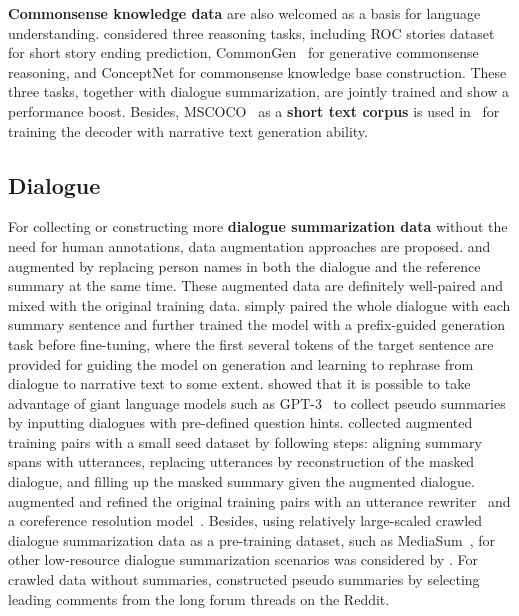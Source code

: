 \textbf{Commonsense knowledge data} are also welcomed as a
basis for language understanding.
\citet{khalifa2021bag} considered three reasoning tasks, including ROC stories 
dataset~\cite{mostafazadeh2016corpus} for short story ending prediction, 
CommonGen~\cite{lin2020commongen} for generative commonsense reasoning, 
and ConceptNet for commonsense knowledge base construction. 
These three tasks, together with dialogue summarization, are jointly trained and show a performance boost.
Besides, MSCOCO~\cite{lin2014microsoft} as a \textbf{short text corpus} is used in~\citet{zou2021low} for training the decoder with narrative text generation ability.


\subsection{Dialogue}

For collecting or constructing more \textbf{dialogue summarization data} 
without the need for human annotations, data augmentation approaches are 
proposed. \citet{liu2021controllable} and \citet{khalifa2021bag} augmented 
by replacing person names in both the dialogue and the reference summary 
at the same time. These augmented data are definitely well-paired and 
mixed with the original training data. 
\citet{jia-etal-2022-post} simply paired the whole dialogue with each summary sentence and further trained the model with a prefix-guided generation task before fine-tuning, where the first several tokens of the target sentence are provided for guiding the model on generation and learning to rephrase from dialogue to narrative text to some extent.
\citet{asi2022end} showed that it is possible to take advantage of giant language models such as GPT-3~\cite{brown2020language} to collect pseudo summaries by inputting dialogues with pre-defined question hints.
\citet{liu2022data} collected augmented training pairs with a small seed dataset by following steps: aligning summary spans with utterances, replacing utterances by reconstruction of the masked dialogue,
and filling up the masked summary given the augmented dialogue. 
\citet{fang2022spoken} augmented and refined the original training pairs with an utterance rewriter~\cite{liu2020incomplete} and a coreference resolution model~\cite{joshi2020spanbert}.
Besides, using relatively large-scaled crawled dialogue summarization data as 
a pre-training dataset, such as MediaSum~\cite{zhu2021mediasum}, 
for other low-resource dialogue summarization scenarios was considered by \citet{zhu2021mediasum}. 
For crawled data without summaries, \citet{yang2022tanet} constructed pseudo summaries by selecting leading comments from the long forum threads on the Reddit.




